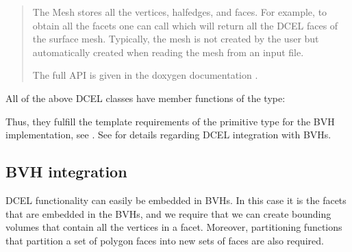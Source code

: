 \documentclass[letterpaper,10pt,english]{sphinxmanual}
\begin{document}
\begin{quote}

\begin{sphinxVerbatim}[commandchars=\\\{\}]
\end{sphinxVerbatim}

\sphinxAtStartPar
The Mesh stores all the vertices, half\sphinxhyphen{}edges, and faces.
For example, to obtain all the facets one can call  which will return all the DCEL faces of the surface mesh.
Typically, the mesh is not created by the user but automatically created when reading the mesh from an input file.

\sphinxAtStartPar
The full API is given in the doxygen documentation .
\end{quote}

\sphinxAtStartPar
All of the above DCEL classes have member functions of the type:

\begin{sphinxVerbatim}[commandchars=\\\{\}]
\end{sphinxVerbatim}

\sphinxAtStartPar
Thus, they fulfill the template requirements of the primitive type for the BVH implementation, see {\hyperref[\detokenize{ImplemBVH:chap-bvhconstraints}]{}}.
See {\hyperref[\detokenize{ImplemDCEL:chap-bvhintegration}]{}} for details regarding DCEL integration with BVHs.


\subsection{BVH integration}
\label{\detokenize{ImplemDCEL:bvh-integration}}\label{\detokenize{ImplemDCEL:chap-bvhintegration}}
\sphinxAtStartPar
DCEL functionality can easily be embedded in BVHs.
In this case it is the facets that are embedded in the BVHs, and we require that we can create bounding volumes that contain all the vertices in a facet.
Moreover, partitioning functions that partition a set of polygon faces into  new sets of faces are also required.
\end{document}
